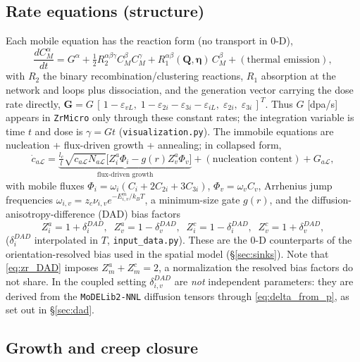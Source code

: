 \documentclass[11pt]{article}
\newcommand{\eps}{\varepsilon}
\newcommand{\kb}{k_{B}}
\newcommand{\Lcal}{\mathcal{L}}
\newcommand{\ZrMicro}{\texttt{ZrMicro}}
\newcommand{\MoDELib}{\texttt{MoDELib2-NNL}}
\newcommand{\code}[1]{\texttt{#1}}
\begin{document}
\subsection{Rate equations (structure)}
\label{sec:rate_structure}

Each mobile equation has the reaction form (no transport in 0-D),
\begin{equation}
\label{eq:zr_mobile_rhs}
    \frac{dC_M^{\alpha}}{dt}
    =
    G^{\alpha}
    +\tfrac12 R_2^{\alpha\beta\gamma}C_M^{\beta}C_M^{\gamma}
    + R_1^{\alpha\beta}(\mathbf{Q},\bm\eta)\,C_M^{\beta}
    + (\text{thermal emission}),
\end{equation}
with $R_2$ the binary recombination/clustering reactions, $R_1$ absorption at the
network and loops plus dissociation, and the generation vector carrying the dose
rate directly,
$\mathbf{G}=G\,[\,1-\eps_{vL},\;1-\eps_{2i}-\eps_{3i}-\eps_{iL},\;\eps_{2i},\;\eps_{3i}\,]^{T}$.
Thus $G$ [dpa/s] appears in \ZrMicro{} only through these constant rates; the
integration variable is time $t$ and dose is $\gamma=G t$
(\code{visualization.py}). The immobile equations are nucleation + flux-driven
growth + annealing; in collapsed form,
\begin{equation}
\label{eq:zr_growth_rate}
    \dot{c}_{a\Lcal}
    =
    \underbrace{\tfrac{l_c}{l}\sqrt{c_{a\Lcal}N_{a\Lcal}}\big[Z_{i}^{a}\Phi_i - g(r)Z_{v}^{a}\Phi_v\big]}_{\text{flux-driven growth}}
    + (\text{nucleation content}) + G_{a\Lcal},
\end{equation}
with mobile fluxes $\Phi_i=\omega_i(C_i+2C_{2i}+3C_{3i})$,
$\Phi_v=\omega_v C_v$, Arrhenius jump frequencies
$\omega_{i,v}=z_c\nu_{i,v}e^{-E^m_{i,v}/\kb T}$, a minimum-size gate $g(r)$, and
the diffusion-anisotropy-difference (DAD) bias factors
\begin{equation}
\label{eq:zr_DAD}
    Z_i^{a}=1+\delta^{DAD}_i,\;\;
    Z_v^{a}=1-\delta^{DAD}_v,\;\;
    Z_i^{c}=1-\delta^{DAD}_i,\;\;
    Z_v^{c}=1+\delta^{DAD}_v,
\end{equation}
($\delta^{DAD}_i$ interpolated in $T$, \code{input\_data.py}). These are the 0-D
counterparts of the orientation-resolved bias used in the spatial model
(\S\ref{sec:sinks}). Note that \eqref{eq:zr_DAD} imposes $Z^a_m+Z^c_m=2$, a
normalization the resolved bias factors do not share. In the coupled setting
$\delta^{DAD}_{i,v}$ are \emph{not} independent parameters: they are derived from
the \MoDELib{} diffusion tensors through \eqref{eq:delta_from_p}, as set out in
\S\ref{sec:dad}.

\subsection{Growth and creep closure}
\label{sec:growth_creep}
\end{document}
